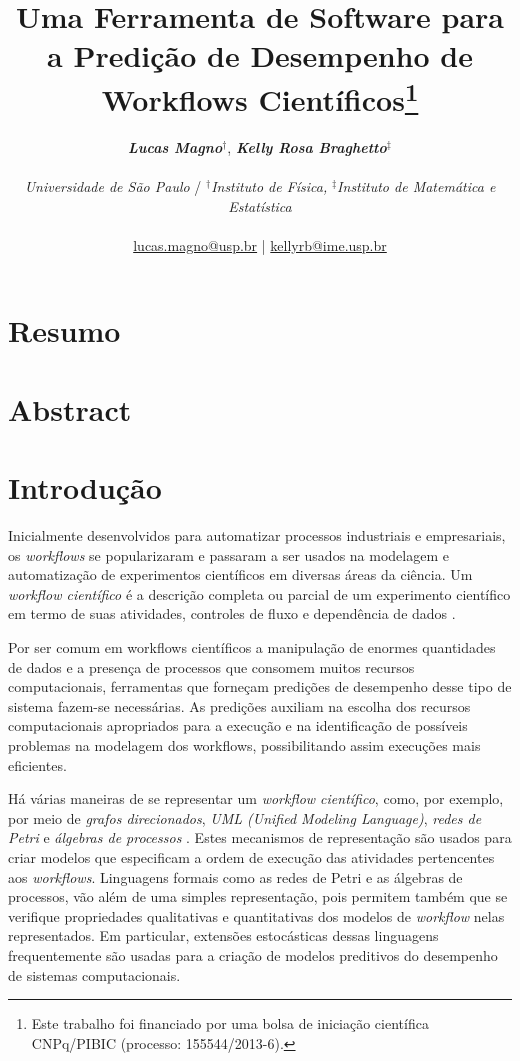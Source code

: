 \documentclass[a4paper,10pt]{article}
\date{}
\title{
    Uma Ferramenta de Software para a Predição de Desempenho de Workflows Científicos\footnote{Este trabalho foi financiado por uma bolsa de iniciação científica CNPq/PIBIC (processo: 155544/2013-6).}
}
\author{
\textbf{\textit{Lucas Magno}}$^\dagger$,\textbf{ \textit{Kelly Rosa Braghetto}}$^\ddagger$\\
\\
\textit{Universidade de São Paulo} / $^\dagger$\textit{Instituto de Física,} $^\ddagger$\textit{Instituto de Matemática e Estatística}\\
\\
\href{mailto:lucas.magno@usp.br}{lucas.magno@usp.br} | \href{mailto:kellyrb@ime.usp.br}{kellyrb@ime.usp.br}
}
\begin{document}
    \maketitle
    \section*{Resumo}


    \section*{Abstract}

	\thispagestyle{fancy}

    \newpage
    \section*{Introdução}
        Inicialmente desenvolvidos para automatizar processos industriais e empresariais, os \emph{workflows} se popularizaram e passaram a ser usados na modelagem e automatização de experimentos científicos em diversas áreas da ciência. Um \emph{workflow científico} é a descrição completa ou parcial de um experimento científico em termo de suas atividades, controles de fluxo e dependência de dados \cite{phd:gadelha12}.

        Por ser comum em workflows científicos a manipulação de enormes quantidades de dados e a presença de processos que consomem muitos recursos computacionais, ferramentas que forneçam predições de desempenho desse tipo de sistema fazem-se necessárias. As predições auxiliam na escolha dos recursos computacionais apropriados para a execução e na identificação de possíveis problemas na modelagem dos workflows, possibilitando assim execuções mais eficientes.

        Há várias maneiras de se representar um \emph{workflow científico}, como, por exemplo, por meio de \emph{grafos direcionados}, \emph{UML \emph{(Unified Modeling Language)}}, \emph{redes de Petri} e \emph{álgebras de processos} \cite{phd:oga11}. Estes mecanismos de representação são usados para criar modelos que especificam a ordem de execução das atividades pertencentes aos \emph{workflows}. Linguagens formais como as redes de Petri e as álgebras de processos, vão além de uma simples representação, pois permitem também que se verifique propriedades qualitativas e quantitativas dos modelos de \emph{workflow} nelas representados. Em particular, extensões estocásticas dessas linguagens frequentemente são usadas para a criação de modelos preditivos do desempenho de sistemas computacionais.
\end{document}
